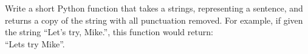  \label{sssec:ex1_25}

Write a short Python function that takes a strings, representing a sentence, and returns a copy of the string with all punctuation removed. For example, if given the string ``Let's try, Mike.'', this function would return:\\
``Lets try Mike''.

